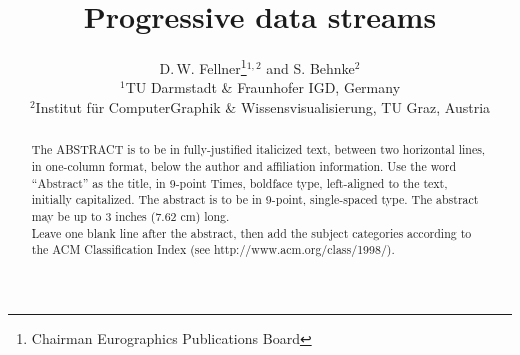 \documentclass{egpubl}
\title[EG \LaTeX\ Author Guidelines]%
{Progressive data streams}
\author[D. Fellner \& S. Behnke]
{D.\,W. Fellner\thanks{Chairman Eurographics Publications Board}$^{1,2}$
  and S. Behnke$^{2}$
  \\
  $^1$TU Darmstadt \& Fraunhofer IGD, Germany\\
  $^2$Institut f{\"u}r ComputerGraphik \& Wissensvisualisierung, TU Graz, Austria
}
\begin{document}
  

\maketitle

\begin{abstract}
  The ABSTRACT is to be in fully-justified italicized text, 
  between two horizontal lines,
  in one-column format, 
  below the author and affiliation information. 
  Use the word ``Abstract'' as the title, in 9-point Times, boldface type, 
  left-aligned to the text, initially capitalized. 
  The abstract is to be in 9-point, single-spaced type.
  The abstract may be up to 3 inches (7.62 cm) long. \\
  Leave one blank line after the abstract, 
  then add the subject categories according to the ACM Classification Index 
  (see http://www.acm.org/class/1998/).
  
  \begin{classification} %
  \end{classification}
  
\end{abstract}

%

\end{document}
